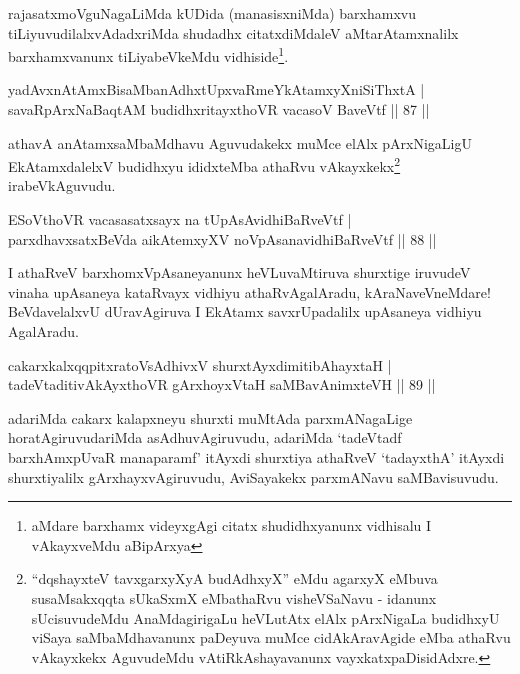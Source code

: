 \begin{artha}
rajasatxmoVguNagaLiMda kUDida (manasisxniMda) barxhamxvu tiLiyuvudilalxvAdadxriMda shudadhx citatxdiMdaleV aMtarAtamxnalilx barxhamxvanunx tiLiyabeVkeMdu  vidhiside\footnote[1]{aMdare barxhamx   videyxgAgi citatx shudidhxyanunx vidhisalu I vAkayxveMdu aBipArxya}.
\end{artha}

\begin{shl}
yadAvx\s nAtAmxBisaMbanAdhxtUpxvaRmeYkAtamxyXniSiThxtA |\\
savaRpArxNaBaqtAM budidhxritayxthoVR vacasoV BaveVtf \hfill || 87 ||
\end{shl}

\begin{artha}
athavA anAtamxsaMbaMdhavu Aguvudakekx muMce elAlx pArxNigaLigU
EkAtamxdalelxV budidhxyu ididxteMba athaRvu
vAkayxkekx\footnote[2]{``dqshayxteV tavxgarxyXyA budAdhxyX'' eMdu agarxyX eMbuva susaMsakxqqta
  sUkaSxmX eMbathaRvu visheVSaNavu - idanunx sUcisuvudeMdu
  AnaMdagirigaLu heVLutAtx elAlx pArxNigaLa budidhxyU viSaya
  saMbaMdhavanunx paDeyuva muMce cidAkAravAgide eMba athaRvu
  vAkayxkekx AguvudeMdu vAtiRkAshayavanunx vayxkatxpaDisidAdxre.} irabeVkAguvudu.
\end{artha}

\begin{shl}
ESoV\s thoVR vacasasatxsayx na tUpAsAvidhiBaRveVtf |\\
parxdhavxsatxBeVda aikAtemxyXV noVpAsanavidhiBaRveVtf \hfill || 88 ||
\end{shl}

\begin{artha}
I athaRveV barxhomxVpAsaneyanunx heVLuvaMtiruva shurxtige iruvudeV vinaha upAsaneya kataRvayx vidhiyu athaRvAgalAradu, kAraNaveVneMdare! BeVdavelalxvU dUravAgiruva I EkAtamx savxrUpadalilx upAsaneya vidhiyu AgalAradu.
\end{artha}

\begin{shl}
cakarxkalxqqpitxratoV\s sAdhivxV shurxtAyxdimitibAhayxtaH |\\
tadeVtaditivAkAyxthoVR gArxhoyxV\s taH saMBavAnimxteVH \hfill || 89 ||
\end{shl}

\begin{artha}
adariMda cakarx kalapxneyu shurxti muMtAda parxmANagaLige horatAgiruvudariMda asAdhuvAgiruvudu, adariMda `tadeVtadf barxhAmxpUvaR manaparamf' itAyxdi shurxtiya athaRveV `tadayxthA' itAyxdi shurxtiyalilx gArxhayxvAgiruvudu, AviSayakekx parxmANavu saMBavisuvudu.
\end{artha}

